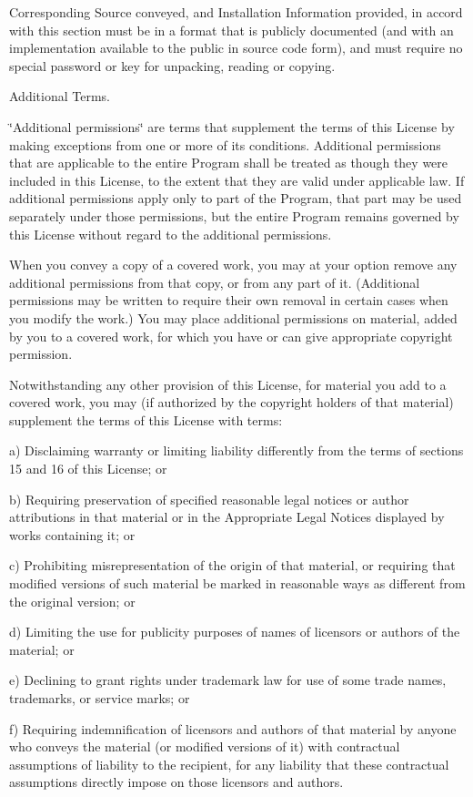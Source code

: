 Corresponding Source conveyed, and Installation Information provided, in accord with this section must be in a format that is publicly documented (and with an implementation available to the public in source code form), and must require no special password or key for unpacking, reading or copying.


\begin{DoxyEnumerate}
\item Additional Terms.
\end{DoxyEnumerate}

\char`\"{}\+Additional permissions\char`\"{} are terms that supplement the terms of this License by making exceptions from one or more of its conditions. Additional permissions that are applicable to the entire Program shall be treated as though they were included in this License, to the extent that they are valid under applicable law. If additional permissions apply only to part of the Program, that part may be used separately under those permissions, but the entire Program remains governed by this License without regard to the additional permissions.

When you convey a copy of a covered work, you may at your option remove any additional permissions from that copy, or from any part of it. (Additional permissions may be written to require their own removal in certain cases when you modify the work.) You may place additional permissions on material, added by you to a covered work, for which you have or can give appropriate copyright permission.

Notwithstanding any other provision of this License, for material you add to a covered work, you may (if authorized by the copyright holders of that material) supplement the terms of this License with terms\+: \begin{DoxyVerb}a) Disclaiming warranty or limiting liability differently from the
terms of sections 15 and 16 of this License; or

b) Requiring preservation of specified reasonable legal notices or
author attributions in that material or in the Appropriate Legal
Notices displayed by works containing it; or

c) Prohibiting misrepresentation of the origin of that material, or
requiring that modified versions of such material be marked in
reasonable ways as different from the original version; or

d) Limiting the use for publicity purposes of names of licensors or
authors of the material; or

e) Declining to grant rights under trademark law for use of some
trade names, trademarks, or service marks; or

f) Requiring indemnification of licensors and authors of that
material by anyone who conveys the material (or modified versions of
it) with contractual assumptions of liability to the recipient, for
any liability that these contractual assumptions directly impose on
those licensors and authors.
\end{DoxyVerb}


